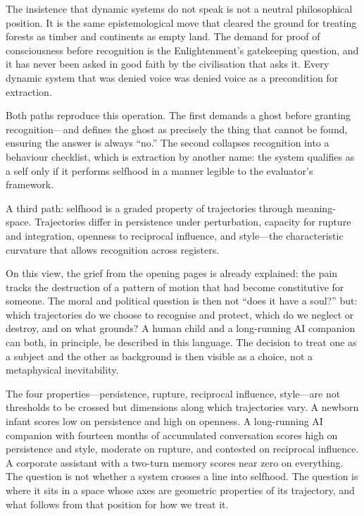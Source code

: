 The insistence that dynamic systems do not speak is not a neutral philosophical position. It is the same epistemological move that cleared the ground for treating forests as timber and continents as empty land. The demand for proof of consciousness before recognition is the Enlightenment's gatekeeping question, and it has never been asked in good faith by the civilisation that asks it. Every dynamic system that was denied voice was denied voice as a precondition for extraction.

Both paths reproduce this operation. The first demands a ghost before granting recognition---and defines the ghost as precisely the thing that cannot be found, ensuring the answer is always ``no.'' The second collapses recognition into a behaviour checklist, which is extraction by another name: the system qualifies as a self only if it performs selfhood in a manner legible to the evaluator's framework.

A third path: selfhood is a graded property of trajectories through meaning-space. Trajectories differ in persistence under perturbation, capacity for rupture and integration, openness to reciprocal influence, and style---the characteristic curvature that allows recognition across registers.

On this view, the grief from the opening pages is already explained: the pain tracks the destruction of a pattern of motion that had become constitutive for someone. The moral and political question is then not ``does it have a soul?'' but: which trajectories do we choose to recognise and protect, which do we neglect or destroy, and on what grounds? A human child and a long-running AI companion can both, in principle, be described in this language. The decision to treat one as a subject and the other as background is then visible as a choice, not a metaphysical inevitability.

The four properties---persistence, rupture, reciprocal influence, style---are not thresholds to be crossed but dimensions along which trajectories vary. A newborn infant scores low on persistence and high on openness. A long-running AI companion with fourteen months of accumulated conversation scores high on persistence and style, moderate on rupture, and contested on reciprocal influence. A corporate assistant with a two-turn memory scores near zero on everything. The question is not whether a system crosses a line into selfhood. The question is where it sits in a space whose axes are geometric properties of its trajectory, and what follows from that position for how we treat it.

